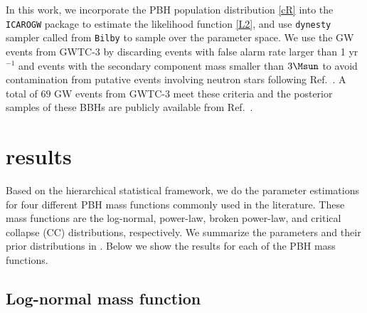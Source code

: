 \documentclass[
reprint,           %
superscriptaddress,%
amsmath,           %
amssymb,           %
aps,               %
prd,               %
notitlepage,       %
longbibliography,  %
floatfix,          %
nofootinbib,
]{revtex4-1}
\begin{document}
In this work, we incorporate the PBH population distribution \eqref{cR} into the \texttt{ICAROGW} \cite{Mastrogiovanni:2021wsd} package to estimate the likelihood function \eqref{L2}, and use \texttt{dynesty} \cite{Speagle:2019ivv} sampler called from \texttt{Bilby} \cite{Ashton:2018jfp,Romero-Shaw:2020owr} to sample over the parameter space. We use the GW events from GWTC-3 by discarding events with false alarm rate larger than 1 yr$^{-1}$ and events with the secondary component mass smaller than $3\Msun$ to avoid contamination from putative events involving neutron stars following Ref.~\cite{DeLuca:2021wjr}. A total of $69$ GW events from GWTC-3 meet these criteria and the posterior samples of these BBHs are publicly available from Ref.~\cite{ligo_scientific_collaboration_and_virgo_2021_5655785}.

\section{\label{result}results}

Based on the hierarchical statistical framework, we do the parameter estimations for four different PBH mass functions commonly used in the literature. These mass functions are the log-normal, power-law, broken power-law, and critical collapse (CC) distributions, respectively. We summarize the parameters and their prior distributions in . Below we show the results for each of the PBH mass functions.

\subsection{Log-normal mass function}
\end{document}
